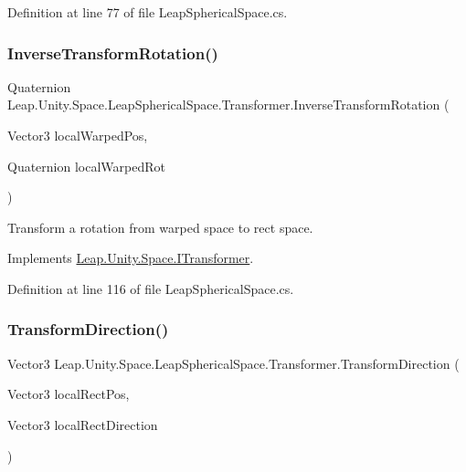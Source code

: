 Definition at line 77 of file Leap\+Spherical\+Space.\+cs.

\mbox{\label{class_leap_1_1_unity_1_1_space_1_1_leap_spherical_space_1_1_transformer_a00568c8a27881e7d49f850eec0ba562e}} 
\subsubsection{\texorpdfstring{InverseTransformRotation()}{InverseTransformRotation()}}
{\footnotesize\ttfamily Quaternion Leap.\+Unity.\+Space.\+Leap\+Spherical\+Space.\+Transformer.\+Inverse\+Transform\+Rotation (\begin{DoxyParamCaption}\item[{Vector3}]{local\+Warped\+Pos,  }\item[{Quaternion}]{local\+Warped\+Rot }\end{DoxyParamCaption})}



Transform a rotation from warped space to rect space. 



Implements \mbox{\hyperlink{interface_leap_1_1_unity_1_1_space_1_1_i_transformer_abfcf877e117b7f70b2ce60259b88c459}{Leap.\+Unity.\+Space.\+I\+Transformer}}.



Definition at line 116 of file Leap\+Spherical\+Space.\+cs.

\mbox{\label{class_leap_1_1_unity_1_1_space_1_1_leap_spherical_space_1_1_transformer_a959b6b39a26640ddbd4bcda77deefde5}} 
\subsubsection{\texorpdfstring{TransformDirection()}{TransformDirection()}}
{\footnotesize\ttfamily Vector3 Leap.\+Unity.\+Space.\+Leap\+Spherical\+Space.\+Transformer.\+Transform\+Direction (\begin{DoxyParamCaption}\item[{Vector3}]{local\+Rect\+Pos,  }\item[{Vector3}]{local\+Rect\+Direction }\end{DoxyParamCaption})}



